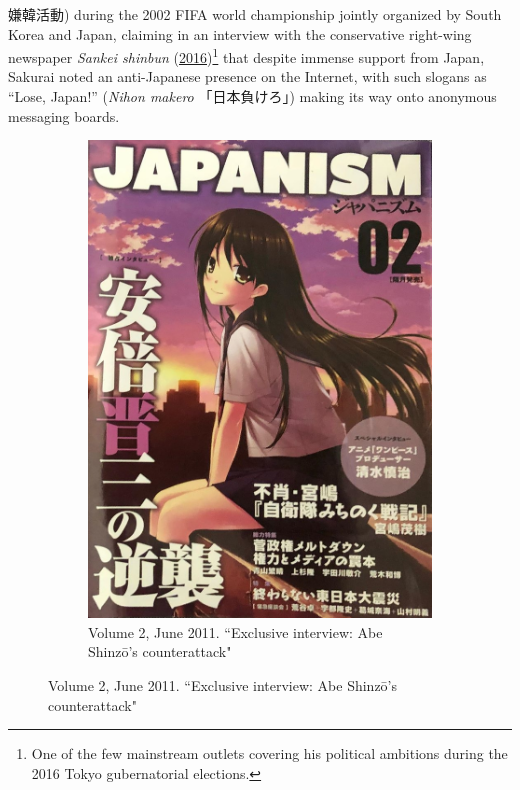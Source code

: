 \documentclass[10pt,british,A4paper,oneside]{memoir}
\begin{document}
嫌韓活動) during the 2002 FIFA world championship jointly organized by
South Korea and Japan, claiming in an interview with the conservative
right-wing newspaper \emph{Sankei shinbun}
(\protect\hyperlink{ref-sankei_news__2016}{2016})\footnote{One of the
  few mainstream outlets covering his political ambitions during the
  2016 Tokyo gubernatorial elections.} that despite immense support from
Japan, Sakurai noted an anti-Japanese presence on the Internet, with
such slogans as ``Lose, Japan!'' (\emph{Nihon makero} 「日本負けろ」)
making its way onto anonymous messaging boards.

\begin{figure}[!htb]
 \centering
 \begin{subfigure}[b]{0.30\textwidth}
 \includegraphics[width=\textwidth]{images/japanism1.jpg}
 \caption{Volume 2, June 2011. ``Exclusive interview: Abe Shinzō’s counterattack"}
 \label{fig:japanism1}
 \end{subfigure}

\end{figure}
\end{document}

